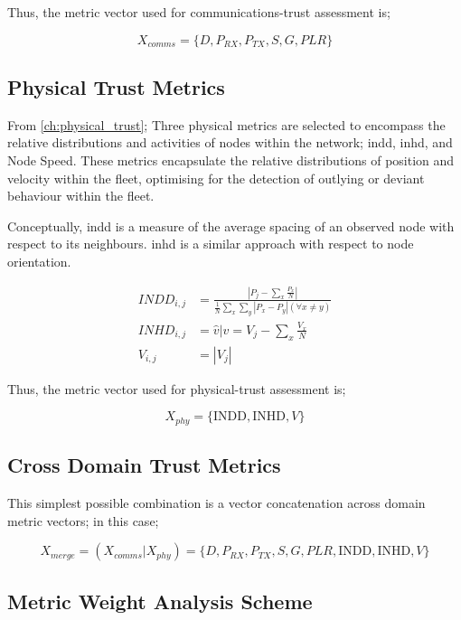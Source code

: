 Thus, the metric vector used for communications-trust assessment is;

\begin{equation}
  X_{comms}=\{D, P_{RX}, P_{TX}, S, G, PLR\}
  \label{eq:comms_vector}
\end{equation}

\subsection{Physical Trust Metrics}

From \autoref{ch:physical_trust}; Three physical metrics are selected to encompass the relative distributions and activities of nodes within the network; \gls{indd}, \gls{inhd}, and Node Speed. These metrics encapsulate the relative distributions of position and velocity within the fleet, optimising for the detection of outlying or deviant behaviour within the fleet.

Conceptually, \gls{indd} is a measure of the average spacing of an observed node with respect to its neighbours. \gls{inhd} is a similar approach with respect to node orientation.

\begin{align}
  INDD_{i,j} &= \frac{|P_j - \sum_x \frac{P_x}{N}|}{\frac{1}{N}\sum_x \sum_y{|P_x - P_y| (\forall x \neq y)}}\\
  INHD_{i,j} &= \hat{v} \vert v= V_j - \sum_x{\frac{V_x}{N}}\\
  V_{i,j} &= |V_j|
\end{align}

Thus, the metric vector used for physical-trust assessment is;

\begin{equation}
  X_{phy}=\{\text{INDD}, \text{INHD}, V\}
  \label{eq:phys:vector}
\end{equation}


\subsection{Cross Domain Trust Metrics}
This simplest possible combination is a vector concatenation across domain metric vectors; in this case; 

\begin{equation}
  X_{merge} =  (X_{comms}|X_{phy}) = \{D, P_{RX}, P_{TX}, S, G, PLR, \text{INDD}, \text{INHD}, V\}
  \label{eq:phys:vector}
\end{equation}


\subsection{Metric Weight Analysis Scheme}

